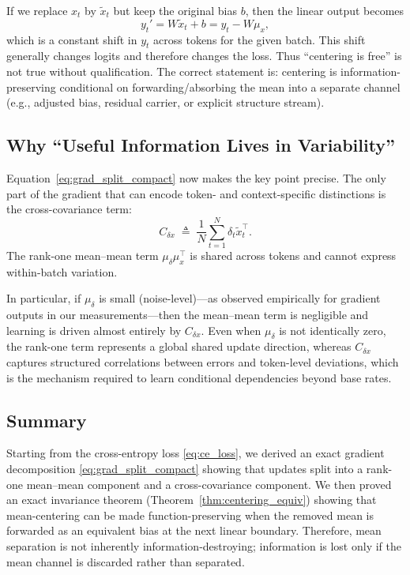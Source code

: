 If we replace $x_t$ by $\tilde{x}_t$ but keep the original bias $b$, then the linear output becomes
\[
y_t' = W\tilde{x}_t + b = y_t - W\mu_x,
\]
which is a constant shift in $y_t$ across tokens for the given batch.
This shift generally changes logits and therefore changes the loss.
Thus ``centering is free'' is not true without qualification.
The correct statement is: centering is information-preserving conditional on forwarding/absorbing the mean into a separate channel (e.g., adjusted bias, residual carrier, or explicit structure stream).

\subsection{Why ``Useful Information Lives in Variability''}

Equation~\eqref{eq:grad_split_compact} now makes the key point precise.
The only part of the gradient that can encode token- and context-specific distinctions is the cross-covariance term:
\begin{equation}
\label{eq:cross_cov}
C_{\delta x}\;\triangleq\;\frac{1}{N}\sum_{t=1}^N \delta_t\tilde{x}_t^\top.
\end{equation}
The rank-one mean--mean term $\mu_\delta\mu_x^\top$ is shared across tokens and cannot express within-batch variation.

In particular, if $\mu_\delta$ is small (noise-level)---as observed empirically for gradient outputs in our measurements---then the mean--mean term is negligible and learning is driven almost entirely by $C_{\delta x}$.
Even when $\mu_\delta$ is not identically zero, the rank-one term represents a global shared update direction, whereas $C_{\delta x}$ captures structured correlations between errors and token-level deviations, which is the mechanism required to learn conditional dependencies beyond base rates.

\subsection{Summary}

Starting from the cross-entropy loss \eqref{eq:ce_loss}, we derived an exact gradient decomposition \eqref{eq:grad_split_compact} showing that updates split into a rank-one mean--mean component and a cross-covariance component.
We then proved an exact invariance theorem (Theorem~\ref{thm:centering_equiv}) showing that mean-centering can be made function-preserving when the removed mean is forwarded as an equivalent bias at the next linear boundary.
Therefore, mean separation is not inherently information-destroying; information is lost only if the mean channel is discarded rather than separated.